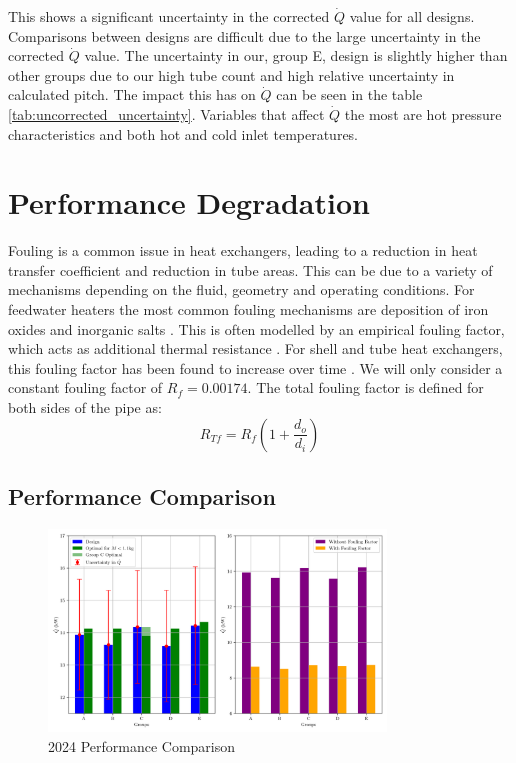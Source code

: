 \documentclass{article}
\begin{document}
This shows a significant uncertainty in the corrected $\dot{Q}$ value for all designs. Comparisons between designs are difficult due to the large uncertainty in the corrected $\dot{Q}$ value.
The uncertainty in our, group E, design is slightly higher than other groups due to our high tube count and high relative uncertainty in calculated pitch.
The impact this has on $\dot{Q}$ can be seen in the table \ref{tab:uncorrected_uncertainty}.
Variables that affect $\dot{Q}$ the most are hot pressure characteristics and both hot and cold inlet temperatures.

\section{Performance Degradation}

Fouling is a common issue in heat exchangers, leading to a reduction in heat transfer coefficient and reduction in tube areas.
This can be due to a variety of mechanisms depending on the fluid, geometry and operating conditions.
For feedwater heaters the most common fouling mechanisms are deposition of iron oxides and inorganic salts \cite{HeatTransfer}.
This is often modelled by an empirical fouling factor, which acts as additional thermal resistance \cite{HeatTransfer}.
For shell and tube heat exchangers, this fouling factor has been found to increase over time \cite{fouling}.
We will only consider a constant fouling factor of $R_f = 0.00174$. The total fouling factor \cite{HE_design} is defined for both sides of the pipe as:
\begin{equation}
    R_{Tf} = R_f \left( 1 + \frac{d_o}{d_i} \right)
\end{equation}

\subsection{Performance Comparison}

\begin{figure}[H]
    \centering
    \includegraphics[width=0.8\textwidth]{2024comparison.png}
    \caption{2024 Performance Comparison}
    \label{fig:2024_performance}
\end{figure}
\end{document}

